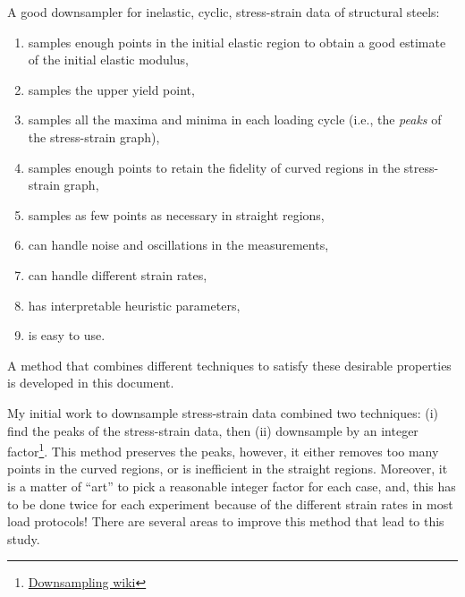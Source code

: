 \documentclass[a4paper,11pt]{article}
\begin{document}
A good downsampler for inelastic, cyclic, stress-strain data of structural steels:
\begin{enumerate}
    \item samples enough points in the initial elastic region to obtain a good estimate of the initial elastic modulus,
    \item samples the upper yield point,
    \item samples all the maxima and minima in each loading cycle (i.e., the \emph{peaks} of the stress-strain graph),
    \item samples enough points to retain the fidelity of curved regions in the stress-strain graph,
    \item samples as few points as necessary in straight regions,
    \item can handle noise and oscillations in the measurements,
    \item can handle different strain rates,
    \item has interpretable heuristic parameters,
    \item is easy to use.
\end{enumerate}
A method that combines different techniques to satisfy these desirable properties is developed in this document.

My initial work to downsample stress-strain data combined two techniques: (i) find the peaks of the stress-strain data, then (ii) downsample by an integer factor\footnote{\href{https://en.wikipedia.org/wiki/Downsampling_(signal_processing)}{Downsampling wiki}}.
This method preserves the peaks, however, it either removes too many points in the curved regions, or is inefficient in the straight regions.
Moreover, it is a matter of ``art'' to pick a reasonable integer factor for each case, and, this has to be done twice for each experiment because of the different strain rates in most load protocols!
There are several areas to improve this method that lead to this study.
\end{document}
